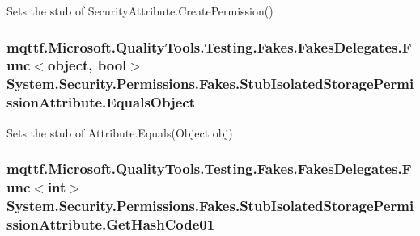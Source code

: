 Sets the stub of Security\-Attribute.\-Create\-Permission()

\hypertarget{class_system_1_1_security_1_1_permissions_1_1_fakes_1_1_stub_isolated_storage_permission_attribute_a24993d1dd5fb8e328ce2630b0af11049}{
\subsubsection[{Equals\-Object}]{\setlength{\rightskip}{0pt plus 5cm}mqttf.\-Microsoft.\-Quality\-Tools.\-Testing.\-Fakes.\-Fakes\-Delegates.\-Func$<$object, bool$>$ System.\-Security.\-Permissions.\-Fakes.\-Stub\-Isolated\-Storage\-Permission\-Attribute.\-Equals\-Object}}\label{class_system_1_1_security_1_1_permissions_1_1_fakes_1_1_stub_isolated_storage_permission_attribute_a24993d1dd5fb8e328ce2630b0af11049}


Sets the stub of Attribute.\-Equals(\-Object obj)

\hypertarget{class_system_1_1_security_1_1_permissions_1_1_fakes_1_1_stub_isolated_storage_permission_attribute_ab5583bb971fc2c808d6c3c4b6f240f5e}{
\subsubsection[{Get\-Hash\-Code01}]{\setlength{\rightskip}{0pt plus 5cm}mqttf.\-Microsoft.\-Quality\-Tools.\-Testing.\-Fakes.\-Fakes\-Delegates.\-Func$<$int$>$ System.\-Security.\-Permissions.\-Fakes.\-Stub\-Isolated\-Storage\-Permission\-Attribute.\-Get\-Hash\-Code01}}\label{class_system_1_1_security_1_1_permissions_1_1_fakes_1_1_stub_isolated_storage_permission_attribute_ab5583bb971fc2c808d6c3c4b6f240f5e}


